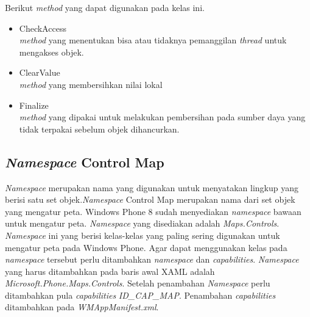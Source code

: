 Berikut \textit{method} yang dapat digunakan pada kelas ini.
\begin{itemize}
	\item CheckAccess\\
	\textit{method} yang menentukan bisa atau tidaknya pemanggilan \textit{thread} untuk mengakses objek.
	\item ClearValue\\
	\textit{method} yang membersihkan nilai lokal
	\item Finalize \\
	\textit{method} yang dipakai untuk melakukan pembersihan pada sumber daya yang tidak terpakai sebelum objek dihancurkan.
\end{itemize}

\subsection{\textit{Namespace} Control Map}
\label{subsubsec:Namespace Control Map}
\hspace{0.5cm} \textit{Namespace} merupakan nama yang digunakan untuk menyatakan lingkup yang berisi satu set objek.\textit{Namespace} Control Map merupakan nama dari set objek yang mengatur peta. Windows Phone 8 sudah menyediakan \textit{namespace} bawaan untuk mengatur peta. \textit{Namespace} yang disediakan adalah \textit{Maps.Controls}. \textit{Namespace} ini yang berisi kelas-kelas yang paling sering digunakan untuk mengatur peta pada Windows Phone.  Agar dapat menggunakan kelas pada \textit{namespace} tersebut perlu ditambahkan \textit{namespace} dan \textit{capabilities}. \textit{Namespace} yang harus ditambahkan pada baris awal XAML adalah \textit{Microsoft.Phone.Maps.Controls}. Setelah penambahan \textit{Namespace} perlu ditambahkan pula \textit{capabilities} \textit{ID\_CAP\_MAP}. Penambahan \textit{capabilities} ditambahkan pada \textit{WMAppManifest.xml}.


